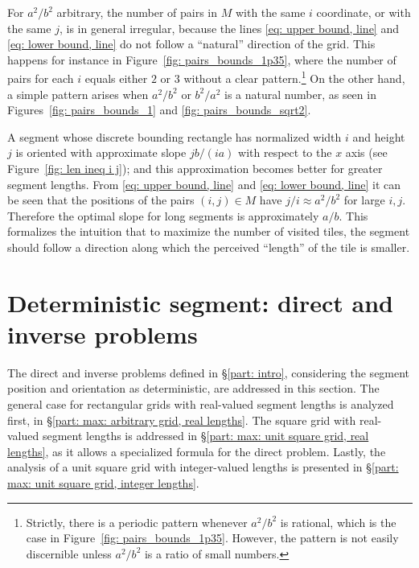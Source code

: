 \documentclass[12pt, a4paper]{article}
\newcommand{\mss}{M}
\begin{document}
For $a^2/b^2$ arbitrary, the number of pairs in $\mss$ with the same $i$ coordinate, or with the same $j$, is in general irregular, because the lines \eqref{eq: upper bound, line} and \eqref{eq: lower bound, line} do not follow a ``natural'' direction of the grid. This happens for instance in Figure~\ref{fig: pairs_bounds_1p35}, where the number of pairs for each $i$ equals either $2$ or $3$ without a clear pattern.\footnote{Strictly, there is a periodic pattern whenever $a^2/b^2$ is rational, which is the case in Figure~\ref{fig: pairs_bounds_1p35}. However, the pattern is not easily discernible unless $a^2/b^2$ is a ratio of small numbers.}
On the other hand, a simple pattern arises when $a^2/b^2$ or $b^2/a^2$ is a natural number, as seen in Figures~\ref{fig: pairs_bounds_1} and \ref{fig: pairs_bounds_sqrt2}.

A segment whose discrete bounding rectangle has normalized width $i$ and height $j$ is oriented with approximate slope $jb/(ia)$ with respect to the $x$ axis (see Figure~\ref{fig: len ineq i j}); and this approximation becomes better for greater segment lengths. From \eqref{eq: upper bound, line} and \eqref{eq: lower bound, line} it can be seen that the positions of the pairs $(i,j) \in \mss$ have $j/i \approx a^2/b^2$ for large $i, j$. Therefore the optimal slope for long segments is approximately $a/b$. This formalizes the intuition that to maximize the number of visited tiles, the segment should follow a direction along which the perceived ``length'' of the tile is smaller.


\section{Deterministic segment: direct and inverse problems}
\label{part: max}

The direct and inverse problems defined in \S\ref{part: intro}, considering the segment position and orientation as deterministic, are addressed in this section. The general case for rectangular grids with real-valued segment lengths is analyzed first, in \S\ref{part: max: arbitrary grid, real lengths}. The square grid with real-valued segment lengths is addressed in \S\ref{part: max: unit square grid, real lengths}, as it allows a specialized formula for the direct problem. Lastly, the analysis of a unit square grid with integer-valued lengths is presented in \S\ref{part: max: unit square grid, integer lengths}.
\end{document}
